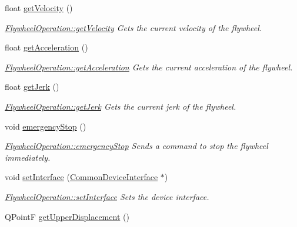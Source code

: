 \begin{DoxyCompactItemize}
float \hyperlink{class_flywheel_operation_a06119af2250971d23869d94fd451ceba}{get\+Velocity} ()
\begin{DoxyCompactList}\small\item\em \hyperlink{class_flywheel_operation_a06119af2250971d23869d94fd451ceba}{Flywheel\+Operation\+::get\+Velocity} Gets the current velocity of the flywheel. \end{DoxyCompactList}\item 
float \hyperlink{class_flywheel_operation_a23310ab41f29ee3d510c2d412fde801b}{get\+Acceleration} ()
\begin{DoxyCompactList}\small\item\em \hyperlink{class_flywheel_operation_a23310ab41f29ee3d510c2d412fde801b}{Flywheel\+Operation\+::get\+Acceleration} Gets the current acceleration of the flywheel. \end{DoxyCompactList}\item 
float \hyperlink{class_flywheel_operation_ad443ef22229c1584da213f50234720bf}{get\+Jerk} ()
\begin{DoxyCompactList}\small\item\em \hyperlink{class_flywheel_operation_ad443ef22229c1584da213f50234720bf}{Flywheel\+Operation\+::get\+Jerk} Gets the current jerk of the flywheel. \end{DoxyCompactList}\item 
\hypertarget{class_flywheel_operation_a6a393e52299f7a48950f019d0f3db7de}{}\label{class_flywheel_operation_a6a393e52299f7a48950f019d0f3db7de} 
void \hyperlink{class_flywheel_operation_a6a393e52299f7a48950f019d0f3db7de}{emergency\+Stop} ()
\begin{DoxyCompactList}\small\item\em \hyperlink{class_flywheel_operation_a6a393e52299f7a48950f019d0f3db7de}{Flywheel\+Operation\+::emergency\+Stop} Sends a command to stop the flywheel immediately. \end{DoxyCompactList}\item 
void \hyperlink{class_flywheel_operation_ab655d2757d24dbb605a8eb0c16bc0fe8}{set\+Interface} (\hyperlink{class_common_device_interface}{Common\+Device\+Interface} $\ast$)
\begin{DoxyCompactList}\small\item\em \hyperlink{class_flywheel_operation_ab655d2757d24dbb605a8eb0c16bc0fe8}{Flywheel\+Operation\+::set\+Interface} Sets the device interface. \end{DoxyCompactList}\item 
Q\+PointF \hyperlink{class_flywheel_operation_a16ebc2fe8c3297350eaf9be2114a75c8}{get\+Upper\+Displacement} ()

\end{DoxyCompactItemize}
